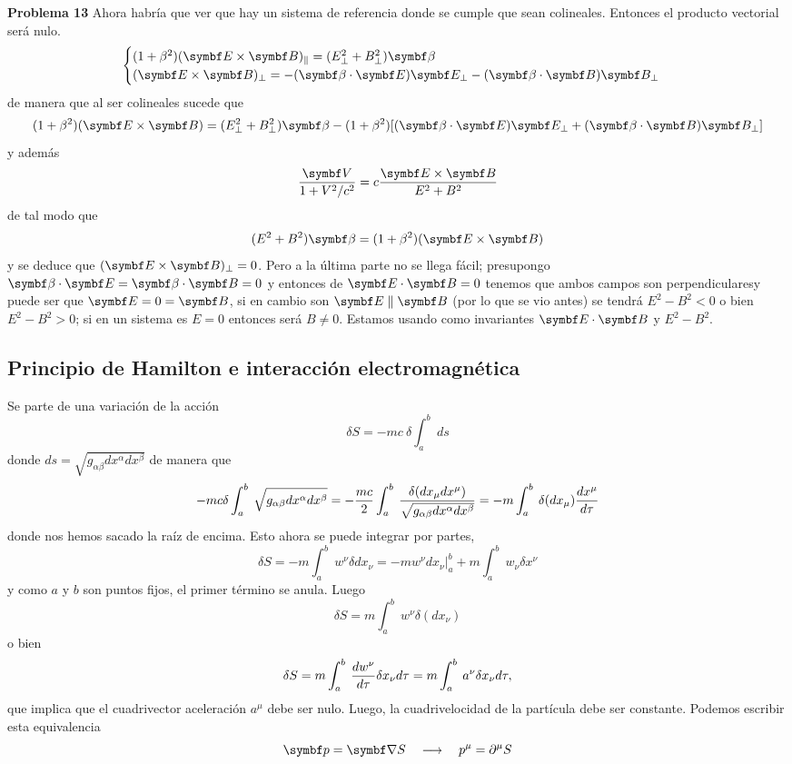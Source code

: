 \documentclass[10pt,oneside]{CBFT_book}
\begin{document}
\begin{ejemplo}{\bf Problema 13}
Ahora habría que ver que hay un sistema de referencia donde se cumple que sean colineales.
Entonces el producto vectorial será nulo.
\[
	\begin{cases}
	( 1 + \beta^2 ) (\pv{E}{B})_\parallel = ( E^2_\perp + B^2_\perp ) \vb{\beta} \\
	(\pv{E}{B})_\perp = -(\pe{\beta}{E}) \vb{E}_\perp - (\pe{\beta}{B}) \vb{B}_\perp
	\end{cases}
\]
de manera que al ser colineales sucede que
\[
	( 1 + \beta^2 ) (\pv{E}{B}) = ( E^2_\perp + B^2_\perp ) \vb{\beta}  -
	( 1 + \beta^2 ) [ (\pe{\beta}{E}) \vb{E}_\perp + (\pe{\beta}{B}) \vb{B}_\perp ]
\]
y además
\[
	\frac{\vb{V}}{1 + V^2/c^2} = c \frac{\pv{E}{B}}{E^2+B^2}
\]
de tal modo que 
\[
	( E^2 + B^2 )\vb{\beta} = ( 1 + \beta^2 )( \pv{E}{B} )
\]
y se deduce que $ ( \pv{E}{B} )_\perp = 0 $.
Pero a la última parte no se llega fácil; presupongo $\pe{\beta}{E} = \pe{\beta}{B} = 0$
y entonces de $\pe{E}{B} = 0$ tenemos que ambos campos son perpendicularesy puede ser que
$\vb{E}= 0 = \vb{B}$, si en cambio son $\vb{E} \parallel \vb{B}$ (por lo que se vio antes) 
se tendrá $E^2 - B^2 < 0$ o bien $E^2 - B^2 > 0$; si en un sistema es $E=0$ entonces será
$B\neq 0$.
Estamos usando como invariantes $\pe{E}{B}$ y $E^2-B^2$.

\end{ejemplo}

\subsection{Principio de Hamilton e interacción electromagnética}

Se parte de una variación de la acción
\[
	\delta S = - m c \: \delta \int_a^b \: ds
\]
donde $ds = \sqrt{ g_{\alpha\beta}dx^\alpha dx^\beta}$ de manera que 
\[
	- m c \delta \int_a^b \: \sqrt{ g_{\alpha\beta}dx^\alpha dx^\beta} =
	- \frac{mc}{2} \int_a^b \: \frac{ \delta( dx_\mu dx^\mu)}{ \sqrt{ g_{\alpha\beta}dx^\alpha dx^\beta} }
	= - m \int_a^b \: \delta( dx_\mu ) \frac{d^{\hspace{-0.05em}} {x^\mu}}{d {\tau}^{\hspace{-0.05em}}}
\]
donde nos hemos sacado la raíz de encima. Esto ahora se puede integrar por
partes,
\[
	\delta S = - m \int_a^b \: w^\nu \delta dx_\nu =  
	- m w^\nu dx_\nu |_a^b + m \int_a^b \: w_\nu \delta x^\nu
\]
y como $a$ y $b$ son puntos fijos, el primer término se anula. Luego
\[
	\delta S =  m \int_a^b \: w^\nu \delta (dx_\nu)
\]
o bien
\[
	\delta S =  m \int_a^b \: \frac{d^{\hspace{-0.05em}} {w^\nu}}{d {\tau}^{\hspace{-0.05em}}} \delta x_\nu  d\tau =
	m \int_a^b \: a^\nu \delta x_\nu  d\tau,
\]
que implica que el cuadrivector aceleración $a^\mu$ debe ser nulo.
Luego, la cuadrivelocidad de la partícula debe ser constante.
Podemos escribir esta equivalencia 
\[
	\vb{p} = \Nabla S \quad \longrightarrow \quad  p^\mu = \partial^\mu S
\]
\end{document}
